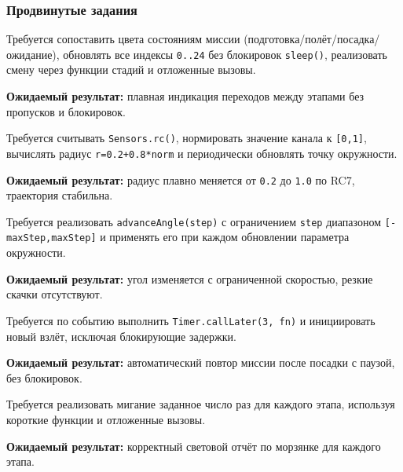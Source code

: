 \subsubsection{Продвинутые задания}

\begin{taskbox}
Требуется сопоставить цвета состояниям миссии (подготовка/полёт/посадка/ожидание), обновлять все индексы \texttt{0..24} без блокировок \texttt{sleep()}, реализовать смену через функции стадий и отложенные вызовы.

\textbf{Ожидаемый результат:} плавная индикация переходов между этапами без пропусков и блокировок.
\end{taskbox}

\begin{taskbox}
Требуется считывать \texttt{Sensors.rc()}, нормировать значение канала к \texttt{[0,1]}, вычислять радиус \texttt{r=0.2+0.8*norm} и периодически обновлять точку окружности.

\textbf{Ожидаемый результат:} радиус плавно меняется от \texttt{0.2} до \texttt{1.0} по RC7, траектория стабильна.
\end{taskbox}

\begin{taskbox}
Требуется реализовать \texttt{advanceAngle(step)} с ограничением \texttt{step} диапазоном \texttt{[-maxStep,maxStep]} и применять его при каждом обновлении параметра окружности.

\textbf{Ожидаемый результат:} угол изменяется с ограниченной скоростью, резкие скачки отсутствуют.
\end{taskbox}

\begin{taskbox}
Требуется по событию выполнить \texttt{Timer.callLater(3, fn)} и инициировать новый взлёт, исключая блокирующие задержки.

\textbf{Ожидаемый результат:} автоматический повтор миссии после посадки с паузой, без блокировок.
\end{taskbox}

\begin{taskbox}
Требуется реализовать мигание заданное число раз для каждого этапа, используя короткие функции и отложенные вызовы.

\textbf{Ожидаемый результат:} корректный световой отчёт по морзянке для каждого этапа.
\end{taskbox}

